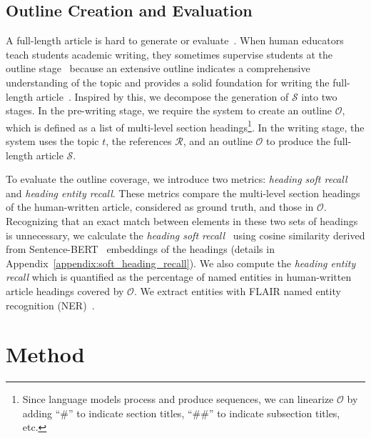 \documentclass[11pt]{article}
\begin{document}
\subsection{Outline Creation and Evaluation}
\label{sec:task_outline}


A full-length article is hard to generate or evaluate~\citep{xu-etal-2023-critical, krishna-etal-2023-longeval}. When human educators teach students academic writing, they sometimes supervise students at the outline stage~\citep{eriksson2015supervision} because an extensive outline indicates a comprehensive understanding of the topic and provides a solid foundation for writing the full-length article~\citep{dietz2019trec}. Inspired by this, we decompose the generation of $\mathcal{S}$ into two stages. In the pre-writing stage, we require the system to create an outline $\mathcal{O}$, which is defined as a list of multi-level section headings\footnote{Since language models process and produce sequences, we can linearize $\mathcal{O}$ by adding ``\#'' to indicate section titles, ``\#\#'' to indicate subsection titles, etc.}. In the writing stage, the system uses the topic $t$, the references $\mathcal{R}$, and an outline $\mathcal{O}$ to produce the full-length article $\mathcal{S}$.


To evaluate the outline coverage, we introduce two metrics: \textit{heading soft recall} and \textit{heading entity recall}. These metrics compare the multi-level section headings of the human-written article, considered as ground truth, and those in $\mathcal{O}$. Recognizing that an exact match between elements in these two sets of headings is unnecessary, we calculate the \textit{heading soft recall}~\citep{franti2023soft} using cosine similarity derived from Sentence-BERT~\citep{reimers-gurevych-2019-sentence} embeddings of the headings (details in Appendix~\ref{appendix:soft_heading_recall}).
We also compute the \textit{heading entity recall} which is quantified as the percentage of named entities in human-written article headings covered by $\mathcal{O}$. We extract entities with FLAIR named entity recognition (NER)~\citep{akbik-etal-2019-flair}.




\section{Method}
\end{document}
